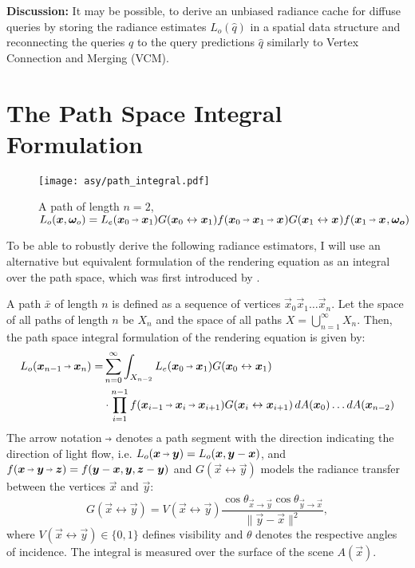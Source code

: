 \textbf{Discussion:} It may be possible, to derive an unbiased radiance cache for diffuse queries by storing the radiance estimates $L_o(\hat{q})$ in a spatial data structure and reconnecting the queries $q$ to the query predictions $\hat{q}$ similarly to Vertex Connection and Merging (VCM). %

\section{The Path Space Integral Formulation}
\begin{figure}[ht]
    \centering
    \texttt{[image: asy/path\_integral.pdf]}
\caption{A path of length $n=2$, $L_o(\vec{x}, \wo) = L_e(\pdir{0}{1}) \G{0}{1} \f{0}{1}{} \G{1}{} f(\pdir{1}{}, \vec{\omega_o})$}
\end{figure}
To be able to robustly derive the following radiance estimators, I will use an alternative but equivalent formulation of the rendering equation as an integral over the path space, which was first introduced by \textcite{veach1997}.

A path $\bar{x}$ of length $n$ is defined as a sequence of vertices $\vec{x}_0 \vec{x}_1 \dots \vec{x}_n$.
Let the space of all paths of length $n$ be $X_n$ and the space of all paths $X = \bigcup_{n=1}^{\infty} X_n$.
Then, the path space integral formulation of the rendering equation is given by:
\begin{equation}
\label{eq:path_space_integral}
\begin{aligned}
    L_o(\pdir{n-1}{n})
    = &\sum_{n=0}^{\infty} \int_{X_{n-2}} L_e(\pdir{0}{1}) \G{0}{1} \\
    &\cdot \prod_{i=1}^{n - 1} \f{i-1}{i}{i+1} \G{i}{i+1}
    \diff A(\vec{x}_0) \dots \diff A(\vec{x}_{n-2})
\end{aligned}
\end{equation}
The arrow notation $\pto$ denotes a path segment with the direction indicating the direction of light flow, i.e. $L_o(\vec{x} \pto \vec{y})=L_o(\vec{x}, \vec{y} - \vec{x})$, and $f(\vec{x} \pto \vec{y} \pto \vec{z})=f(\vec{y} - \vec{x}, \vec{y}, \vec{z} - \vec{y})$ and $G(\vec{x} \leftrightarrow \vec{y})$ models the radiance transfer between the vertices $\vec{x}$ and $\vec{y}$:
\begin{equation}
\label{eq:transfer}
G(\vec{x} \leftrightarrow \vec{y}) = V(\vec{x} \leftrightarrow \vec{y}) \frac{\cos \theta_{\vec{x} \to \vec{y}} \cos \theta_{\vec{y} \to \vec{x}}}{\|\vec{y} - \vec{x}\|^2},
\end{equation}
where $V(\vec{x} \leftrightarrow \vec{y}) \in \{0,1\}$ defines visibility and $\theta$ denotes the respective angles of incidence.
The integral is measured over the surface of the scene $A(\vec{x})$.

